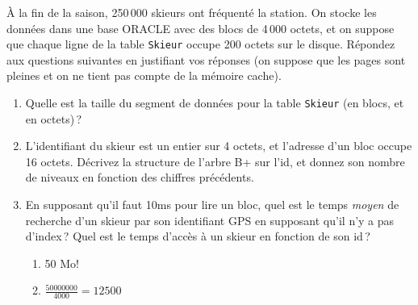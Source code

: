 \`A la fin de la saison, 250\,000 skieurs
ont fréquenté la station. On stocke
les données dans une base ORACLE avec des blocs
de 4\,000 octets, et on 
suppose que chaque ligne de la table \texttt{Skieur} occupe
200 octets sur le disque. 
 Répondez aux questions suivantes en justifiant
    vos réponses (on suppose que les pages sont pleines
   et on ne tient pas compte de la mémoire cache).
  \begin{enumerate}
   \item Quelle est la taille du segment de données pour 
           la table \texttt{Skieur} (en blocs, et en octets)\,? 


  \item L'identifiant du skieur est un entier sur 4 octets,
         et l'adresse d'un bloc occupe 16 octets. Décrivez
          la structure de l'arbre B+ sur l'id, et donnez son nombre de niveaux
         en fonction des chiffres précédents. 

  \item En supposant qu'il faut 10ms pour lire un bloc, 
         quel est le temps {\em moyen} de recherche d'un skieur
         par son identifiant GPS en supposant qu'il n'y a pas d'index\,?
       Quel est le temps d'accès à un skieur en fonction de son id\,?

\begin{solution}
\begin{enumerate}
  \item 50 Mo!
  \item $\frac{50000000}{4000}=12500$
\end{enumerate}
\end{solution}
\end{enumerate}


